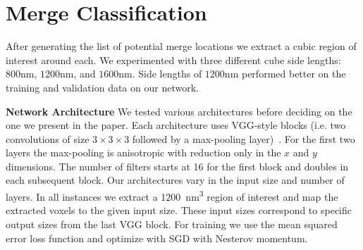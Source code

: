 \section{Merge Classification}

After generating the list of potential merge locations we extract a cubic region of interest around each.
We experimented with three different cube side lengths: $800 \textrm{nm}$, $1200 \textrm{nm}$, and $1600 \textrm{nm}$. 
Side lengths of $1200 \textrm{nm}$ performed better on the training and validation data on our network. 

\vspace{1cm}

\noindent
\textbf{Network Architecture}
We tested various architectures before deciding on the one we present in the paper. 
Each architecture uses VGG-style blocks (i.e. two convolutions of size $3\times3\times3$ followed by a max-pooling layer)~\cite{chatfield2014return}.
For the first two layers the max-pooling is anisotropic with reduction only in the $x$ and $y$ dimensions. 
The number of filters starts at 16 for the first block and doubles in each subsequent block.
Our architectures vary in the input size and number of layers. 
In all instances we extract a \SI{1200}{\nano\meter^3} region of interest and map the extracted voxels to the given input size. 
These input sizes correspond to specific output sizes from the last VGG block.
For training we use the mean squared error loss function and optimize with SGD with Nesterov momentum.

